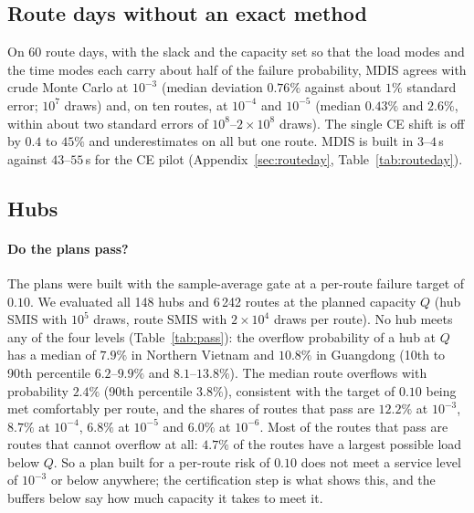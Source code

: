\documentclass[ijoc,sglanonrev]{informs4}
\begin{document}
\subsection{Route days without an exact method}
\label{sec:routedaymain}
On 60 route days, with the slack and the capacity set so that the load modes
and the time modes each carry about half of the failure probability, MDIS agrees
with crude Monte Carlo at $10^{-3}$ (median deviation $0.76\%$ against about $1\%$
standard error; $10^7$ draws) and, on ten routes, at $10^{-4}$ and $10^{-5}$
(median $0.43\%$ and $2.6\%$, within about two standard errors of
$10^8$--$2\times10^8$ draws). The single CE shift is off by $0.4$ to $45\%$ and
underestimates on all but one route. MDIS is built in $3$--$4$\,s against $43$--$55$\,s for
the CE pilot (Appendix~\ref{sec:routeday}, Table~\ref{tab:routeday}).

\subsection{Hubs}
\label{sec:hubs}
\paragraph{Do the plans pass?} The plans were built with the sample-average
gate at a per-route failure target of $0.10$. We evaluated all 148 hubs and
6\,242 routes at the planned capacity $Q$ (hub SMIS with $10^5$ draws, route
SMIS with $2\times10^4$ draws per route). No hub meets any of the four levels
(Table~\ref{tab:pass}): the overflow probability of a hub at $Q$ has a median
of $7.9\%$ in Northern Vietnam and $10.8\%$ in Guangdong (10th to 90th
percentile $6.2$--$9.9\%$ and $8.1$--$13.8\%$). The median route overflows
with probability $2.4\%$ (90th percentile $3.8\%$), consistent with the
target of $0.10$ being met comfortably per route, and the shares of routes that
pass are $12.2\%$ at $10^{-3}$, $8.7\%$ at $10^{-4}$, $6.8\%$ at $10^{-5}$ and
$6.0\%$ at $10^{-6}$. Most of the routes that pass are routes that cannot
overflow at all: $4.7\%$ of the routes have a largest possible load below $Q$.
So a plan built for a per-route risk of $0.10$ does not meet a service level of
$10^{-3}$ or below anywhere; the certification step is what shows this, and
the buffers below say how much capacity it takes to meet it.
\end{document}
